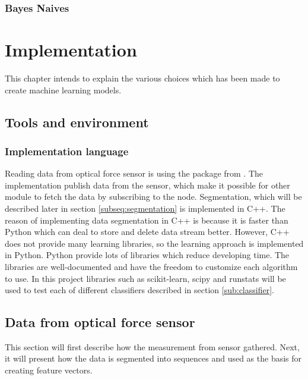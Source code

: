 \documentclass[USenglish]{ifimaster}  %
\begin{document}
\subsection{Bayes Naives}

\chapter{Implementation}\label{ch:implementation}        %
This chapter intends to explain the various choices which has been made to create machine learning models.
	
\section{Tools and environment}
	
\subsection{Implementation language}
Reading data from optical force sensor is using the package from \cite{optoRos}. The implementation publish data from the sensor, which make it possible for other module to fetch the data by subscribing to the node. Segmentation, which will be described later in section \ref{subseq:segmentation} is implemented in C++. The reason of implementing data segmentation in C++ is because it is faster than Python which can deal to store and delete data stream better. However, C++ does not provide many learning libraries, so the learning approach is implemented in Python. Python provide lots of libraries which reduce developing time. The libraries are well-documented and have the freedom to customize each algorithm to use. In this project libraries such as scikit-learn, scipy and runstats will be used to test each of different classifiers described in section \ref{sub:classifier}.
		
	
	
\section{Data from optical force sensor}
This section will first describe how the measurement from sensor gathered. Next, it will present how the data is segmented into sequences and used as the basis for creating feature vectors.
	
\end{document}
